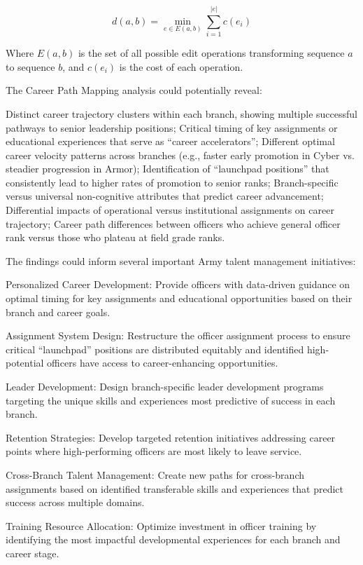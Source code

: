 \documentclass[../main.tex]{subfiles}
\begin{document}
\[ d(a,b) = \min_{e \in E(a,b)} \sum_{i=1}^{|e|} c(e_i) \]

Where \(E(a,b)\) is the set of all possible edit operations transforming sequence \(a\) to sequence \(b\), and \(c(e_i)\) is the cost of each operation.

The Career Path Mapping analysis could potentially reveal:

Distinct career trajectory clusters within each branch, showing multiple successful pathways to senior leadership positions; Critical timing of key assignments or educational experiences that serve as ``career accelerators''; Different optimal career velocity patterns across branches (e.g., faster early promotion in Cyber vs. steadier progression in Armor); Identification of ``launchpad positions'' that consistently lead to higher rates of promotion to senior ranks; Branch-specific versus universal non-cognitive attributes that predict career advancement; Differential impacts of operational versus institutional assignments on career trajectory; Career path differences between officers who achieve general officer rank versus those who plateau at field grade ranks.

The findings could inform several important Army talent management initiatives:

Personalized Career Development: Provide officers with data-driven guidance on optimal timing for key assignments and educational opportunities based on their branch and career goals.

Assignment System Design: Restructure the officer assignment process to ensure critical ``launchpad'' positions are distributed equitably and identified high-potential officers have access to career-enhancing opportunities.

Leader Development: Design branch-specific leader development programs targeting the unique skills and experiences most predictive of success in each branch.

Retention Strategies: Develop targeted retention initiatives addressing career points where high-performing officers are most likely to leave service.

Cross-Branch Talent Management: Create new paths for cross-branch assignments based on identified transferable skills and experiences that predict success across multiple domains.

Training Resource Allocation: Optimize investment in officer training by identifying the most impactful developmental experiences for each branch and career stage.
\end{document}
